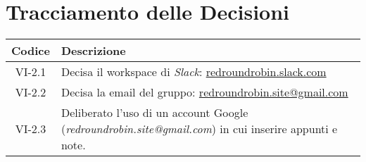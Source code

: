 \section*{Tracciamento delle Decisioni}

\begin{center}
	\begin{longtable}{|c|p{14.5cm}|}
	\hline
	\rowcolor{lighter-grayer}
	\textbf{Codice} & \textbf{Descrizione} \\
	\hline
	\endfirsthead

	\hline
	VI-2.1 & Decisa il workspace di \textit{Slack}: \href{http://redroundrobin.slack.com}{redroundrobin.slack.com} \\
	\hline
	VI-2.2 & Decisa la email del gruppo: \href{mailto:redroundrobin.site@gmail.com}{redroundrobin.site@gmail.com} \\
	\hline
	VI-2.3 & Deliberato l'uso di un account Google (\textit{redroundrobin.site@gmail.com}) in cui inserire appunti e note. \\
	\hline

	\end{longtable}
\end{center}